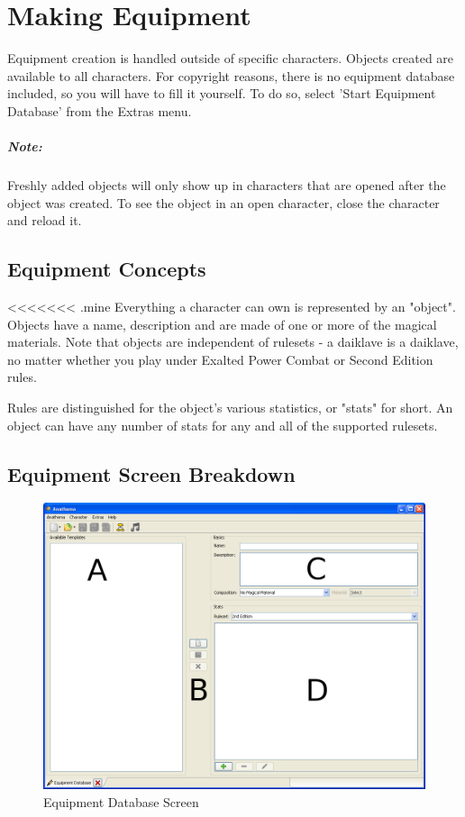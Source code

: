 \chapter{Making Equipment}
Equipment creation is handled outside of specific characters. Objects created are available to all characters. For copyright reasons, there is no equipment database included, so you will have to fill it yourself.  To do so, select 'Start Equipment Database' from the Extras menu.

\paragraph{Note:} Freshly added objects will only show up in characters that are opened after the object was created. To see the object in an open character, close the character and reload it.

\section{Equipment Concepts}
<<<<<<< .mine
Everything a character can own is represented by an "object". Objects have a name, description and are made of one or more of the magical materials. Note that objects are independent of rulesets - a daiklave is a daiklave, no matter whether you play under Exalted Power Combat or Second Edition rules.

Rules are distinguished for the object's various statistics, or "stats" for short. An object can have any number of stats for any and all of the supported rulesets.

\section{Equipment Screen Breakdown}
\begin{figure}
	\centering
		\includegraphics[width=1.00\textwidth]{images/Equipment.png}
	\caption{Equipment Database Screen}
	\label{fig:Equipment}
\end{figure}

